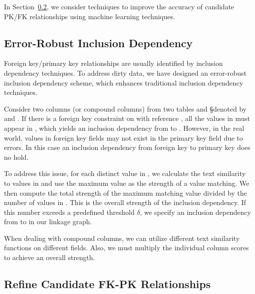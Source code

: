 In Section~\ref{subsec:refine}, we consider techniques to improve the accuracy of candidate PK/FK relationships using machine learning techniques.


\subsection{Error-Robust Inclusion Dependency}\label{subsec:eind}

Foreign key/primary key relationships are usually identified by inclusion dependency techniques. To address dirty data, we have designed an error-robust inclusion dependency scheme, which enhances traditional inclusion dependency techniques.

Consider two columns (or compound columns) from two tables \R and \S denoted by \RX and \SY. If there is a foreign key constraint on \RX with reference \SY, all the values in \RX must appear in \SY, which yields an inclusion dependency from \RX to \SY. However, in the real world, values in foreign key fields may not exist in the primary key field due to errors.  In this case an inclusion dependency from foreign key to primary key does no hold. 

To address this issue, for each distinct value in \RX, we calculate the text similarity to values in \SY and use the maximum value as the strength of a value matching. We then compute the total strength of the maximum matching value divided by the number of values in \RX. This is the overall strength of the inclusion dependency.  If this number exceeds a predefined threshold $\delta$, we specify an inclusion dependency from \RX to \SY in our linkage graph. 

When dealing with compound columns, we can utilize different text similarity functions on different fields. Also, we must multiply the individual column scores to achieve an overall strength.


\subsection{Refine Candidate FK-PK Relationships}\label{subsec:refine}


